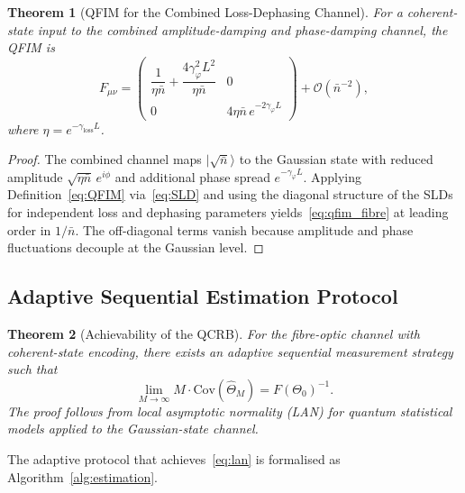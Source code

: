 \documentclass[journal,twocolumn]{IEEEtran}
\theoremstyle{definition}
\theoremstyle{plain}
\newtheorem{theorem}{Theorem}[section]
\begin{document}
\begin{theorem}[QFIM for the Combined Loss-Dephasing Channel]
\label{thm:qfim_fibre}
For a coherent-state input to the combined amplitude-damping and
phase-damping channel, the QFIM is
\begin{equation}
  F_{\mu\nu} =
  \begin{pmatrix}
    \dfrac{1}{\eta\bar n} + \dfrac{4\gamma_\varphi^2 L^2}{\eta\bar n}
    & 0 \\[8pt]
    0 & 4\eta\bar n\,e^{-2\gamma_\varphi L}
  \end{pmatrix}
  + \mathcal{O}(\bar n^{-2}),
  \label{eq:qfim_fibre}
\end{equation}
where $\eta = e^{-\gamma_{\mathrm{loss}} L}$.
\end{theorem}

\begin{proof}
The combined channel maps $|\sqrt{\bar n}\rangle$ to the Gaussian
state with reduced amplitude $\sqrt{\eta\bar n}\,e^{i\phi}$ and
additional phase spread $e^{-\gamma_\varphi L}$.  Applying
Definition~\ref{eq:QFIM} via~\eqref{eq:SLD} and using the diagonal
structure of the SLDs for independent loss and dephasing parameters
yields~\eqref{eq:qfim_fibre} at leading order in $1/\bar n$.  The
off-diagonal terms vanish because amplitude and phase fluctuations
decouple at the Gaussian level.
\end{proof}

\subsection{Adaptive Sequential Estimation Protocol}

\begin{theorem}[Achievability of the QCRB]
\label{thm:qcrb_achieve}
For the fibre-optic channel with coherent-state encoding, there
exists an adaptive sequential measurement strategy such that
\begin{equation}
  \lim_{M\to\infty} M\cdot \mathrm{Cov}(\hat\Theta_M) =
  F(\Theta_0)^{-1}.
  \label{eq:lan}
\end{equation}
The proof follows from local asymptotic normality (LAN) for
quantum statistical models applied to the Gaussian-state channel.
\end{theorem}

The adaptive protocol that achieves~\eqref{eq:lan} is formalised
as Algorithm~\ref{alg:estimation}.
\end{document}
